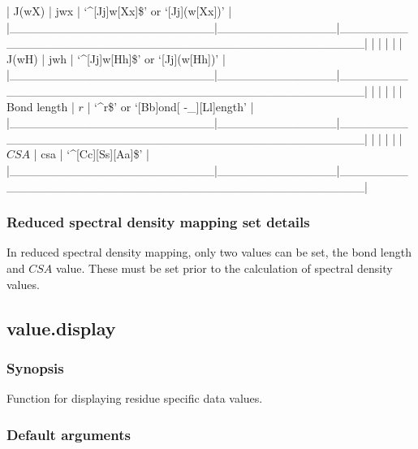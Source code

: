 | J(wX)                  | jwx          | `\^{}[Jj]w[Xx]\$' or `[Jj](w[Xx])'                   |
|\_\_\_\_\_\_\_\_\_\_\_\_\_\_\_\_\_\_\_\_\_\_\_\_|\_\_\_\_\_\_\_\_\_\_\_\_\_\_|\_\_\_\_\_\_\_\_\_\_\_\_\_\_\_\_\_\_\_\_\_\_\_\_\_\_\_\_\_\_\_\_\_\_\_\_\_\_\_\_\_\_\_\_\_\_\_\_\_\_|
|                        |              |                                                  |
| J(wH)                  | jwh          | `\^{}[Jj]w[Hh]\$' or `[Jj](w[Hh])'                   |
|\_\_\_\_\_\_\_\_\_\_\_\_\_\_\_\_\_\_\_\_\_\_\_\_|\_\_\_\_\_\_\_\_\_\_\_\_\_\_|\_\_\_\_\_\_\_\_\_\_\_\_\_\_\_\_\_\_\_\_\_\_\_\_\_\_\_\_\_\_\_\_\_\_\_\_\_\_\_\_\_\_\_\_\_\_\_\_\_\_|
|                        |              |                                                  |
| Bond length            | $r$            | `\^{}r\$' or `[Bb]ond[ -\_][Ll]ength'                 |
|\_\_\_\_\_\_\_\_\_\_\_\_\_\_\_\_\_\_\_\_\_\_\_\_|\_\_\_\_\_\_\_\_\_\_\_\_\_\_|\_\_\_\_\_\_\_\_\_\_\_\_\_\_\_\_\_\_\_\_\_\_\_\_\_\_\_\_\_\_\_\_\_\_\_\_\_\_\_\_\_\_\_\_\_\_\_\_\_\_|
|                        |              |                                                  |
| $CSA$                    | csa          | `\^{}[Cc][Ss][Aa]\$'                                 |
|\_\_\_\_\_\_\_\_\_\_\_\_\_\_\_\_\_\_\_\_\_\_\_\_|\_\_\_\_\_\_\_\_\_\_\_\_\_\_|\_\_\_\_\_\_\_\_\_\_\_\_\_\_\_\_\_\_\_\_\_\_\_\_\_\_\_\_\_\_\_\_\_\_\_\_\_\_\_\_\_\_\_\_\_\_\_\_\_\_|



\subsubsection{Reduced spectral density mapping set details}

In reduced spectral density mapping, only two values can be set, the bond length and $CSA$
value.  These must be set prior to the calculation of spectral density values.


\newpage

\subsection{value.display}


\subsubsection{Synopsis}

Function for displaying residue specific data values.

\subsubsection{Default arguments}


